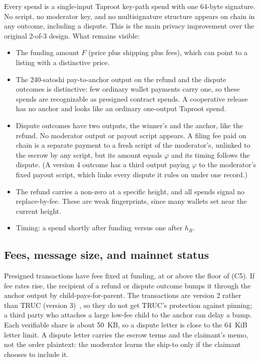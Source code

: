 Every spend is a single-input Taproot key-path spend with one 64-byte signature. No script, no moderator key, and no multisignature structure appears on chain in any outcome, including a dispute. This is the main privacy improvement over the original 2-of-3 design. What remains visible:
\begin{itemize}
  \item The funding amount $F$ (price plus shipping plus fees), which can point to a listing with a distinctive price.
  \item The 240-satoshi pay-to-anchor output on the refund and the dispute outcomes is distinctive: few ordinary wallet payments carry one, so these spends are recognizable as presigned contract spends. A cooperative release has no anchor and looks like an ordinary one-output Taproot spend.
  \item Dispute outcomes have two outputs, the winner's and the anchor, like the refund. No moderator output or payout script appears. A filing fee paid on chain is a separate payment to a fresh script of the moderator's, unlinked to the escrow by any script, but its amount equals $\varphi$ and its timing follows the dispute. (A version 4 outcome has a third output paying $\varphi$ to the moderator's fixed payout script, which links every dispute it rules on under one record.)
  \item The refund carries a non-zero  at a specific height, and all spends signal no replace-by-fee. These are weak fingerprints, since many wallets set  near the current height.
  \item Timing: a spend shortly after funding versus one after $h_R$.
\end{itemize}

\subsection{Fees, message size, and mainnet status}

Presigned transactions have fees fixed at funding, at or above the floor of (C5). If fee rates rise, the recipient of a refund or dispute outcome bumps it through the anchor output by child-pays-for-parent. The transactions are version 2 rather than TRUC (version 3)~\citep{bip431}, so they do not get TRUC's protection against pinning; a third party who attaches a large low-fee child to the anchor can delay a bump. Each verifiable share is about 50~KB, so a dispute letter is close to the 64~KiB letter limit. A dispute letter carries the escrow terms and the claimant's memo, not the order plaintext: the moderator learns the ship-to only if the claimant chooses to include it.

